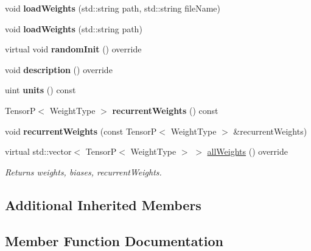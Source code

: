 \begin{DoxyCompactItemize}
\mbox{\label{classRNN_adf49a6020139ee133005c8e0ae624575}} 
void {\bfseries load\+Weights} (std\+::string path, std\+::string file\+Name)
\item 
\mbox{\label{classRNN_a0e7af5b35e64b088cd2e36c4eaaa025c}} 
void {\bfseries load\+Weights} (std\+::string path)
\item 
\mbox{\label{classRNN_a24a32b96c421a0326ee4eba259e1a54d}} 
virtual void {\bfseries random\+Init} () override
\item 
\mbox{\label{classRNN_a454e36c174128529564d6262bca1597a}} 
void {\bfseries description} () override
\item 
\mbox{\label{classRNN_a4d27b40893532d971f1023fd078572af}} 
uint {\bfseries units} () const
\item 
\mbox{\label{classRNN_a072f6d8d440b25690ac2b2b9d1838655}} 
TensorP$<$ Weight\+Type $>$ {\bfseries recurrent\+Weights} () const
\item 
\mbox{\label{classRNN_a5d9baee1f9014bc9fdfbe60d9ebfe91c}} 
void {\bfseries recurrent\+Weights} (const TensorP$<$ Weight\+Type $>$ \&recurrent\+Weights)
\item 
\mbox{\label{classRNN_ae5f39545d8e0ced2fa43d52eca5dabd1}} 
virtual std\+::vector$<$ TensorP$<$ Weight\+Type $>$ $>$ \hyperlink{classRNN_ae5f39545d8e0ced2fa43d52eca5dabd1}{all\+Weights} () override
\begin{DoxyCompactList}\small\item\em Returns weights, biases, recurrent\+Weights. \end{DoxyCompactList}\end{DoxyCompactItemize}
\subsection*{Additional Inherited Members}


\subsection{Member Function Documentation}
\mbox{\label{classRNN_a890f6b8ea11485596a26f7fc5f42bfea}} 
